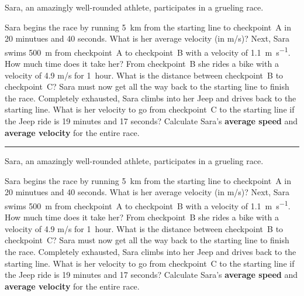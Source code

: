 \documentclass[12pt]{exam}
\newcommand{\prob}{

  \noindent
  Sara, an amazingly well-rounded athlete, participates in a grueling race.

 \begin{questions}
 
  \question 
      Sara begins the race by running 5~km from the starting line to checkpoint~A in 20 minutues and 40 seconds.  What is her average velocity (in m/s)?
    \question
      Next, Sara swims \SI{500}{\meter} from checkpoint~A to checkpoint~B with a velocity of \SI{1.1}{\meter\per\second}.  How much time does it take her?
    \question
      From checkpoint~B she rides a bike with a velocity of 4.9 m/s for 1~hour.  What is the distance between checkpoint~B to checkpoint~C?
    \question
      Sara must now get all the way back to the starting line to finish the race.  Completely exhausted, Sara climbs into her Jeep and drives back to the starting line.  What is her velocity to go from checkpoint~C to the starting line if the Jeep ride is 19 minutes and 17 seconds?
    \question
      Calculate Sara's {\bf average speed} and {\bf average velocity} for the entire race.
 \end{questions}
}
\begin{document}
  \large

  \prob
  \hrule
  \vs
  \prob
\end{document}
